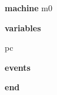\begin{block}
  \item   \textbf{machine} m0
  \item   \textbf{variables}
  \begin{block}
    \item   pc
  \end{block}
  \item   
  \item   
  \item   \textbf{events}
  \begin{block}
    \item   
  \end{block}
  \item   \textbf{end} \\
\end{block}
